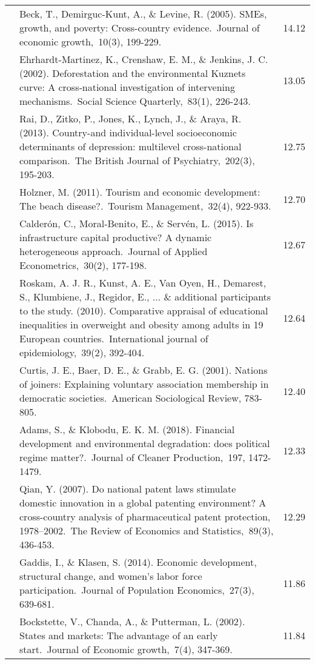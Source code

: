 \documentclass[
  man,floatsintext]{apa6}
\begin{document}
\begin{center}
\begin{ThreePartTable}
{\begin{longtable}{m{2cm}m{11cm}m{2cm}}
 & Beck, T., Demirguc-Kunt, A., \& Levine, R. (2005). SMEs, growth, and poverty: Cross-country evidence. Journal of economic growth, 10(3), 199-229. & 14.12\\
 & Ehrhardt‐Martinez, K., Crenshaw, E. M., \& Jenkins, J. C. (2002). Deforestation and the environmental Kuznets curve: A cross‐national investigation of intervening mechanisms. Social Science Quarterly, 83(1), 226-243. & 13.05\\
 & Rai, D., Zitko, P., Jones, K., Lynch, J., \& Araya, R. (2013). Country-and individual-level socioeconomic determinants of depression: multilevel cross-national comparison. The British Journal of Psychiatry, 202(3), 195-203. & 12.75\\
 & Holzner, M. (2011). Tourism and economic development: The beach disease?. Tourism Management, 32(4), 922-933. & 12.70\\
 & Calderón, C., Moral‐Benito, E., \& Servén, L. (2015). Is infrastructure capital productive? A dynamic heterogeneous approach. Journal of Applied Econometrics, 30(2), 177-198. & 12.67\\
 & Roskam, A. J. R., Kunst, A. E., Van Oyen, H., Demarest, S., Klumbiene, J., Regidor, E., ... \& additional participants to the study. (2010). Comparative appraisal of educational inequalities in overweight and obesity among adults in 19 European countries. International journal of epidemiology, 39(2), 392-404. & 12.64\\
 & Curtis, J. E., Baer, D. E., \& Grabb, E. G. (2001). Nations of joiners: Explaining voluntary association membership in democratic societies. American Sociological Review, 783-805. & 12.40\\
 & Adams, S., \& Klobodu, E. K. M. (2018). Financial development and environmental degradation: does political regime matter?. Journal of Cleaner Production, 197, 1472-1479. & 12.33\\
 & Qian, Y. (2007). Do national patent laws stimulate domestic innovation in a global patenting environment? A cross-country analysis of pharmaceutical patent protection, 1978–2002. The Review of Economics and Statistics, 89(3), 436-453. & 12.29\\
 & Gaddis, I., \& Klasen, S. (2014). Economic development, structural change, and women’s labor force participation. Journal of Population Economics, 27(3), 639-681. & 11.86\\
 & Bockstette, V., Chanda, A., \& Putterman, L. (2002). States and markets: The advantage of an early start. Journal of Economic growth, 7(4), 347-369. & 11.84\\

\end{longtable}}
\end{ThreePartTable}
\end{center}
\end{document}
